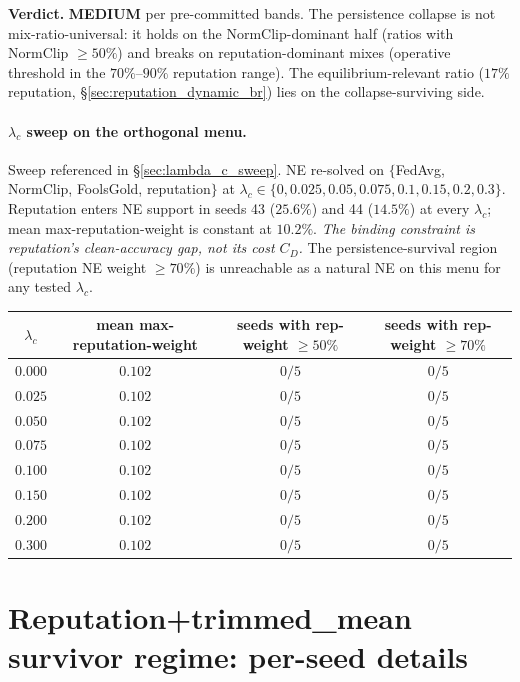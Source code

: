 \documentclass{article}
\begin{document}
\textbf{Verdict.} \textbf{MEDIUM} per pre-committed bands. The persistence collapse is not mix-ratio-universal: it holds on the NormClip-dominant half (ratios with NormClip $\geq 50\%$) and breaks on reputation-dominant mixes (operative threshold in the $70\%$--$90\%$ reputation range). The equilibrium-relevant ratio ($17\%$ reputation, §\ref{sec:reputation_dynamic_br}) lies on the collapse-surviving side.

\paragraph{$\lambda_c$ sweep on the orthogonal menu.} Sweep referenced in §\ref{sec:lambda_c_sweep}. NE re-solved on $\{$FedAvg, NormClip, FoolsGold, reputation$\}$ at $\lambda_c \in \{0, 0.025, 0.05, 0.075, 0.1, 0.15, 0.2, 0.3\}$. Reputation enters NE support in seeds 43 ($25.6\%$) and 44 ($14.5\%$) at every $\lambda_c$; mean max-reputation-weight is constant at $10.2\%$. \emph{The binding constraint is reputation's clean-accuracy gap, not its cost $C_D$.} The persistence-survival region (reputation NE weight $\geq 70\%$) is unreachable as a natural NE on this menu for any tested $\lambda_c$.

\begin{center}\small
\begin{tabular}{c|c|c|c}
\toprule
$\lambda_c$ & mean max-reputation-weight & seeds with rep-weight $\geq 50\%$ & seeds with rep-weight $\geq 70\%$ \\
\midrule
$0.000$ & $0.102$ & $0/5$ & $0/5$ \\
$0.025$ & $0.102$ & $0/5$ & $0/5$ \\
$0.050$ & $0.102$ & $0/5$ & $0/5$ \\
$0.075$ & $0.102$ & $0/5$ & $0/5$ \\
$0.100$ & $0.102$ & $0/5$ & $0/5$ \\
$0.150$ & $0.102$ & $0/5$ & $0/5$ \\
$0.200$ & $0.102$ & $0/5$ & $0/5$ \\
$0.300$ & $0.102$ & $0/5$ & $0/5$ \\
\bottomrule
\end{tabular}
\end{center}

\section{Reputation+trimmed\_mean survivor regime: per-seed details}
\label{app:rep_tm_survivor_details}
\end{document}
